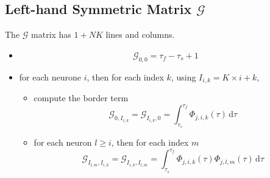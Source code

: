 \documentclass{revtex4}
\begin{document}
\subsection{Left-hand Symmetric Matrix $\mathcal{G}$}
The $\mathcal{G}$ matrix has $1+NK$ lines and columns.
\begin{itemize}
	\item 
		$$ 
		\mathcal{G}_{0,0} = \tau_f-\tau_s+1
		$$
	\item for each neurone $i$, then for each index $k$, using $I_{i,k}=K\times i + k$,
		\begin{itemize}
		\item compute the border term
		$$
			\mathcal{G}_{0,I_{i,k}} = \mathcal{G}_{I_{i,k},0} = \int_{\tau_s}^{\tau_f} \Phi_{j,i,k}(\tau) \, \mathrm{d}\tau
		$$
		\item for each neuron $l\geq i$, then for each index $m$
		$$
			\mathcal{G}_{I_{l,m},I_{i,k}} = \mathcal{G}_{I_{i,k},I_{l,m}}  =
			\int_{\tau_s}^{\tau_f}  \Phi_{j,i,k}(\tau) \Phi_{j,l,m}(\tau) \, \mathrm{d}\tau
		$$
		\end{itemize}
	
\end{itemize}
\end{document}
